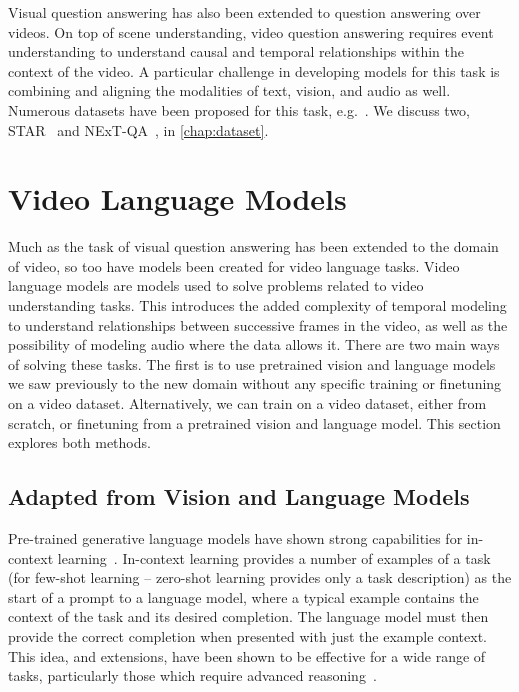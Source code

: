 Visual question answering has also been extended to question answering over
videos. On top of scene understanding, video question answering requires event
understanding to understand causal and temporal relationships within the
context of the video. A particular challenge in developing models for this task
is combining and aligning the modalities of text, vision, and audio as well.
Numerous datasets have been proposed for this task,
e.g.~\citet{xu2016msr-vtt,wu2021star,xiao2021nextqa,lei2020tvqaplus}. We discuss
two, STAR~\citep{wu2021star} and NExT-QA~\citep{xiao2021nextqa}, in
\cref{chap:dataset}.


\section{Video Language Models}
\label{sec:vidlma}

Much as the task of visual question answering has been extended to the domain
of video, so too have models been created for video language tasks. Video
language models are models used to solve problems related to video
understanding tasks. This introduces the added complexity of temporal modeling
to understand relationships between successive frames in the video, as well as
the possibility of modeling audio where the data allows it. There are two main
ways of solving these tasks. The first is to use pretrained vision and language
models we saw previously to the new domain without any specific training or
finetuning on a video dataset.  Alternatively, we can train on a video dataset,
either from scratch, or finetuning from a pretrained vision and language model.
This section explores both methods.

\subsection{Adapted from Vision and Language Models}
\label{sec:adaptvlm}

Pre-trained generative language models have shown strong capabilities for
in-context learning~\citep{brown2020gpt3}. In-context learning provides a number
of examples of a task (for few-shot learning -- zero-shot learning provides only
a task description) as the start of a prompt to a language model, where a
typical example contains the context of the task and its desired completion.
The language model must then provide the correct completion when presented with
just the example context. This idea, and extensions, have been shown to be
effective for a wide range of tasks, particularly those which require advanced
reasoning~\citep{wei2022cot,kojima2022step}.

